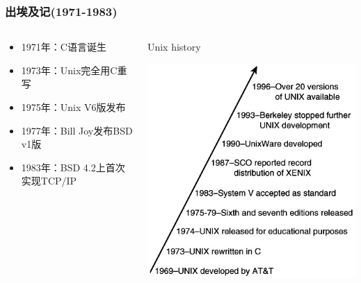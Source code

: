 \documentclass[xcolor=svgnames,bigger,presentation]{beamer}
\begin{document}
\begin{frame}
\frametitle{出埃及记(1971-1983)}
\label{sec-2-1-2}
\begin{columns}
\begin{column}{0.6\textwidth}
\label{sec-2-1-2-1}
\begin{itemize}

\item 1971年：C语言诞生
\label{sec-2-1-2-2}%

\item 1973年：Unix完全用C重写
\label{sec-2-1-2-3}%

\item 1975年：Unix V6版发布
\label{sec-2-1-2-4}%

\item 1977年：Bill Joy发布BSD v1版
\label{sec-2-1-2-5}%

\item 1983年：BSD 4.2上首次实现TCP/IP
\label{sec-2-1-2-6}%
\end{itemize} %
\end{column}
\begin{column}{0.4\textwidth}
\begin{exampleblock}{Unix history}
\label{sec-2-1-2-7}

\includegraphics[width=1\textwidth]{img/unix-history.jpg}
\end{exampleblock}
\end{column}
\end{columns}
\end{frame}
\end{document}
